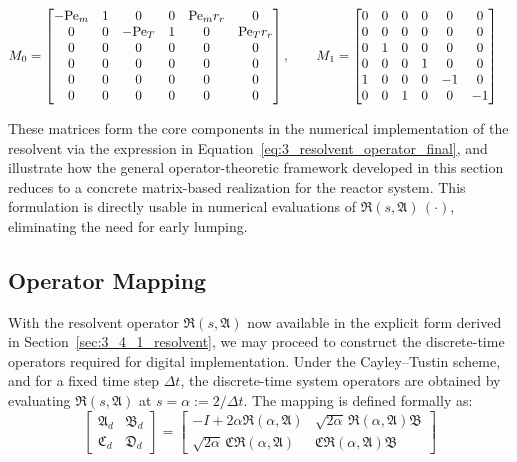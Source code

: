 \begin{equation} \label{eq:3_example_M0M1}
\begin{aligned}
M_0 &= 
\begin{bmatrix}
-{\rm Pe}_m & 1 & 0 & 0 & {\rm Pe}_m r_r & 0 \\
0 & 0 & -{\rm Pe}_T & 1 & 0 & {\rm Pe}_T r_r \\
0 & 0 & 0 & 0 & 0 & 0 \\
0 & 0 & 0 & 0 & 0 & 0 \\
0 & 0 & 0 & 0 & 0 & 0 \\
0 & 0 & 0 & 0 & 0 & 0
\end{bmatrix}, \qquad
M_1 = 
\begin{bmatrix}
0 & 0 & 0 & 0 & 0 & 0 \\
0 & 0 & 0 & 0 & 0 & 0 \\
0 & 1 & 0 & 0 & 0 & 0 \\
0 & 0 & 0 & 1 & 0 & 0 \\
1 & 0 & 0 & 0 & -1 & 0 \\
0 & 0 & 1 & 0 & 0 & -1
\end{bmatrix}
\end{aligned}
\end{equation}

These matrices form the core components in the numerical implementation of the resolvent via the expression in Equation~\eqref{eq:3_resolvent_operator_final}, and illustrate how the general operator-theoretic framework developed in this section reduces to a concrete matrix-based realization for the reactor system. This formulation is directly usable in numerical evaluations of $\mathfrak{R}(s, \mathfrak{A})\, (\cdot)$, eliminating the need for early lumping.


\subsection{Operator Mapping} \label{sec:3_4_2_dt_operators}

With the resolvent operator $\mathfrak{R}(s, \mathfrak{A})$ now available in the explicit form derived in Section~\ref{sec:3_4_1_resolvent}, we may proceed to construct the discrete-time operators required for digital implementation. Under the Cayley--Tustin scheme, and for a fixed time step $\Delta t$, the discrete-time system operators are obtained by evaluating $\mathfrak{R}(s, \mathfrak{A})$ at $s = \alpha := 2 / \Delta t$. The mapping is defined formally as:
\begin{equation} \label{eq:3_discrete_mappings}
\begin{bmatrix}
\mathfrak{A}_d & \mathfrak{B}_d \\
\mathfrak{C}_d & \mathfrak{D}_d
\end{bmatrix}
=
\begin{bmatrix}
-I + 2\alpha \mathfrak{R}(\alpha, \mathfrak{A}) & \sqrt{2\alpha}\, \mathfrak{R}(\alpha, \mathfrak{A}) \mathfrak{B} \\
\sqrt{2\alpha}\, \mathfrak{C} \mathfrak{R}(\alpha, \mathfrak{A}) & \mathfrak{C} \mathfrak{R}(\alpha, \mathfrak{A}) \mathfrak{B}
\end{bmatrix}
\end{equation}

